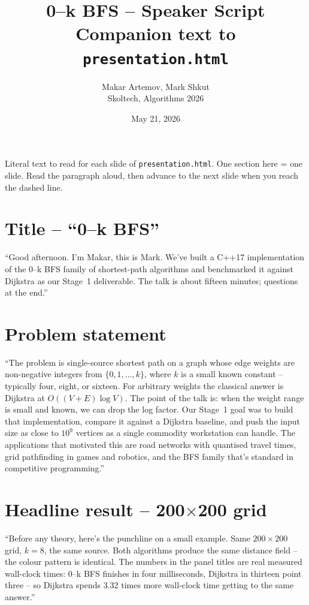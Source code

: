 \documentclass[11pt,a4paper]{article}
\title{\vspace{-2em}\textbf{0--k BFS -- Speaker Script}\\
\large Companion text to \texttt{presentation.html}}
\author{Makar Artemov, Mark Shkut \\ Skoltech, Algorithms 2026}
\date{May 21, 2026}
\begin{document}
\maketitle
\vspace{-1em}

Literal text to read for each slide of \texttt{presentation.html}. One
section here = one slide. Read the paragraph aloud, then advance to the
next slide when you reach the dashed line.

\section{Title -- ``0--k BFS''}
``Good afternoon. I'm Makar, this is Mark. We've built a C++17
implementation of the 0--k BFS family of shortest-path algorithms and
benchmarked it against Dijkstra as our Stage~1 deliverable. The talk is
about fifteen minutes; questions at the end.''
\hrulefill

\section{Problem statement}
``The problem is single-source shortest path on a graph whose edge
weights are non-negative integers from $\{0,1,\dots,k\}$, where $k$ is
a small known constant -- typically four, eight, or sixteen. For
arbitrary weights the classical answer is Dijkstra at $O((V+E)\log V)$.
The point of the talk is: when the weight range is small and known,
we can drop the log factor. Our Stage~1 goal was to build that
implementation, compare it against a Dijkstra baseline, and push the
input size as close to $10^9$ vertices as a single commodity workstation
can handle. The applications that motivated this are road networks
with quantised travel times, grid pathfinding in games and robotics,
and the BFS family that's standard in competitive programming.''
\hrulefill

\section{Headline result -- 200$\times$200 grid}
``Before any theory, here's the punchline on a small example. Same
$200{\times}200$ grid, $k=8$, the same source. Both algorithms produce
the same distance field -- the colour pattern is identical. The numbers
in the panel titles are real measured wall-clock times: 0--k BFS
finishes in four milliseconds, Dijkstra in thirteen point three -- so
Dijkstra spends 3.32 times more wall-clock time getting to the same
answer.''
\hrulefill
\end{document}
